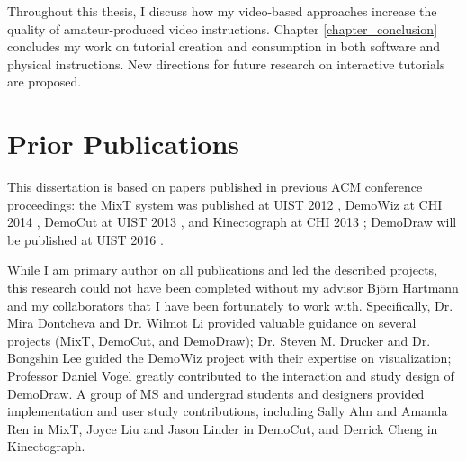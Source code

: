Throughout this thesis, I discuss how my video-based approaches increase the quality of amateur-produced video instructions. Chapter \ref{chapter_conclusion} concludes my work on tutorial creation and consumption in both software and physical instructions. New directions for future research on interactive tutorials are proposed.


\section {Prior Publications}

This dissertation is based on papers published in previous ACM conference proceedings: the MixT system was published at UIST 2012 \cite{Chi:2012:MAG:2380116.2380130}, DemoWiz at CHI 2014 \cite{Chi:2014:DRS:2556288.2557254}, DemoCut at UIST 2013 \cite{Chi:2013:DGC:2501988.2502052}, and Kinectograph at CHI 2013 \cite{Cheng:2013:BCC:2468356.2468568}; DemoDraw will be published at UIST 2016 \cite{Chi:2016:DemoDraw}.

While I am primary author on all publications and led the described projects, this research could not have been completed without my advisor Bj\"orn Hartmann and my collaborators that I have been fortunately to work with. Specifically, Dr. Mira Dontcheva and Dr. Wilmot Li provided valuable guidance on several projects (MixT, DemoCut, and DemoDraw); Dr. Steven M. Drucker and Dr. Bongshin Lee guided the DemoWiz project with their expertise on visualization; Professor Daniel Vogel greatly contributed to the interaction and study design of DemoDraw. A group of MS and undergrad students and designers provided implementation and user study contributions, including Sally Ahn and Amanda Ren in MixT, Joyce Liu and Jason Linder in DemoCut, and Derrick Cheng in Kinectograph.

